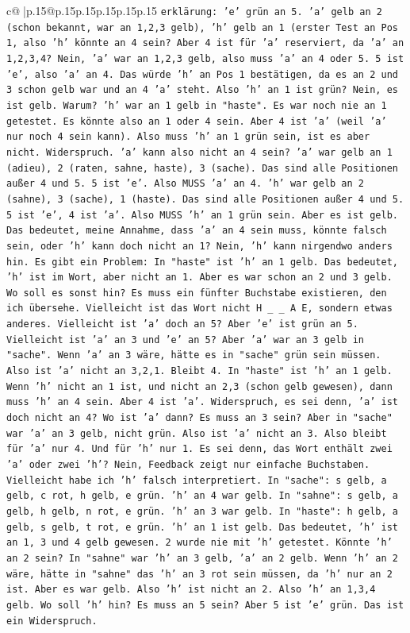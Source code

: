 \documentclass{article}
\begin{document}
{\begin{supertabular}{c@{$\;$}|p{.15\linewidth}@{}p{.15\linewidth}p{.15\linewidth}p{.15\linewidth}p{.15\linewidth}p{.15\linewidth}}
{{{                \texttt{erklärung: 'e' grün an 5. 'a' gelb an 2 (schon bekannt, war an 1,2,3 gelb), 'h' gelb an 1 (erster Test an Pos 1, also 'h' könnte an 4 sein? Aber 4 ist für 'a' reserviert, da 'a' an 1,2,3,4? Nein, 'a' war an 1,2,3 gelb, also muss 'a' an 4 oder 5. 5 ist 'e', also 'a' an 4. Das würde 'h' an Pos 1 bestätigen, da es an 2 und 3 schon gelb war und an 4 'a' steht. Also 'h' an 1 ist grün? Nein, es ist gelb. Warum? 'h' war an 1 gelb in "haste". Es war noch nie an 1 getestet. Es könnte also an 1 oder 4 sein. Aber 4 ist 'a' (weil 'a' nur noch 4 sein kann). Also muss 'h' an 1 grün sein, ist es aber nicht. Widerspruch. 'a' kann also nicht an 4 sein? 'a' war gelb an 1 (adieu), 2 (raten, sahne, haste), 3 (sache). Das sind alle Positionen außer 4 und 5. 5 ist 'e'. Also MUSS 'a' an 4. 'h' war gelb an 2 (sahne), 3 (sache), 1 (haste). Das sind alle Positionen außer 4 und 5. 5 ist 'e', 4 ist 'a'. Also MUSS 'h' an 1 grün sein. Aber es ist gelb. Das bedeutet, meine Annahme, dass 'a' an 4 sein muss, könnte falsch sein, oder 'h' kann doch nicht an 1? Nein, 'h' kann nirgendwo anders hin. Es gibt ein Problem: In "haste" ist 'h' an 1 gelb. Das bedeutet, 'h' ist im Wort, aber nicht an 1. Aber es war schon an 2 und 3 gelb. Wo soll es sonst hin? Es muss ein fünfter Buchstabe existieren, den ich übersehe. Vielleicht ist das Wort nicht H \_ \_ A E, sondern etwas anderes. Vielleicht ist 'a' doch an 5? Aber 'e' ist grün an 5. Vielleicht ist 'a' an 3 und 'e' an 5? Aber 'a' war an 3 gelb in "sache". Wenn 'a' an 3 wäre, hätte es in "sache" grün sein müssen. Also ist 'a' nicht an 3,2,1. Bleibt 4. In "haste" ist 'h' an 1 gelb. Wenn 'h' nicht an 1 ist, und nicht an 2,3 (schon gelb gewesen), dann muss 'h' an 4 sein. Aber 4 ist 'a'. Widerspruch, es sei denn, 'a' ist doch nicht an 4? Wo ist 'a' dann? Es muss an 3 sein? Aber in "sache" war 'a' an 3 gelb, nicht grün. Also ist 'a' nicht an 3. Also bleibt für 'a' nur 4. Und für 'h' nur 1. Es sei denn, das Wort enthält zwei 'a' oder zwei 'h'? Nein, Feedback zeigt nur einfache Buchstaben. Vielleicht habe ich 'h' falsch interpretiert. In "sache": s gelb, a gelb, c rot, h gelb, e grün. 'h' an 4 war gelb. In "sahne": s gelb, a gelb, h gelb, n rot, e grün. 'h' an 3 war gelb. In "haste": h gelb, a gelb, s gelb, t rot, e grün. 'h' an 1 ist gelb. Das bedeutet, 'h' ist an 1, 3 und 4 gelb gewesen. 2 wurde nie mit 'h' getestet. Könnte 'h' an 2 sein? In "sahne" war 'h' an 3 gelb, 'a' an 2 gelb. Wenn 'h' an 2 wäre, hätte in "sahne" das 'h' an 3 rot sein müssen, da 'h' nur an 2 ist. Aber es war gelb. Also 'h' ist nicht an 2. Also 'h' an 1,3,4 gelb. Wo soll 'h' hin? Es muss an 5 sein? Aber 5 ist 'e' grün. Das ist ein Widerspruch. } \\
}}}
\end{supertabular}}
\end{document}
